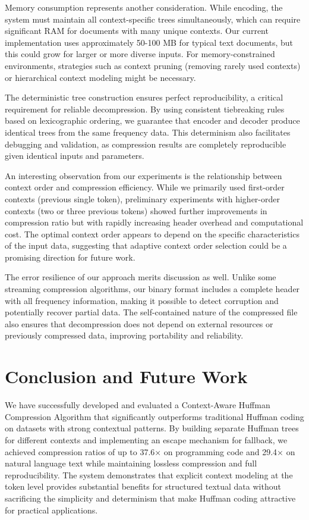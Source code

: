 \documentclass[conference]{IEEEtran}
\begin{document}
Memory consumption represents another consideration. While encoding, the system must maintain all context-specific trees simultaneously, which can require significant RAM for documents with many unique contexts. Our current implementation uses approximately 50-100 MB for typical text documents, but this could grow for larger or more diverse inputs. For memory-constrained environments, strategies such as context pruning (removing rarely used contexts) or hierarchical context modeling might be necessary.

The deterministic tree construction ensures perfect reproducibility, a critical requirement for reliable decompression. By using consistent tiebreaking rules based on lexicographic ordering, we guarantee that encoder and decoder produce identical trees from the same frequency data. This determinism also facilitates debugging and validation, as compression results are completely reproducible given identical inputs and parameters.

An interesting observation from our experiments is the relationship between context order and compression efficiency. While we primarily used first-order contexts (previous single token), preliminary experiments with higher-order contexts (two or three previous tokens) showed further improvements in compression ratio but with rapidly increasing header overhead and computational cost. The optimal context order appears to depend on the specific characteristics of the input data, suggesting that adaptive context order selection could be a promising direction for future work.

The error resilience of our approach merits discussion as well. Unlike some streaming compression algorithms, our binary format includes a complete header with all frequency information, making it possible to detect corruption and potentially recover partial data. The self-contained nature of the compressed file also ensures that decompression does not depend on external resources or previously compressed data, improving portability and reliability.

\section{Conclusion and Future Work}
We have successfully developed and evaluated a Context-Aware Huffman Compression Algorithm that significantly outperforms traditional Huffman coding on datasets with strong contextual patterns. By building separate Huffman trees for different contexts and implementing an escape mechanism for fallback, we achieved compression ratios of up to 37.6× on programming code and 29.4× on natural language text while maintaining lossless compression and full reproducibility. The system demonstrates that explicit context modeling at the token level provides substantial benefits for structured textual data without sacrificing the simplicity and determinism that make Huffman coding attractive for practical applications.
\end{document}
